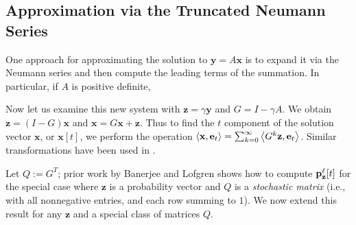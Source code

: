 \subsection{Approximation via the Truncated Neumann Series}

One approach for approximating the solution to $\mathbf{y} = A\mathbf{x}$ is to expand it via the Neumann series and then compute the leading terms of the summation.
In particular, if $A$ is positive definite, 

Now let us examine this new system with $\mathbf{z} = \gamma \mathbf{y}$ and $G = I - \gamma A$. 
We obtain $\mathbf{z} = (I - G)\mathbf{x}$ and $\mathbf{x} = G\mathbf{x} + \mathbf{z}$. 
Thus to find the $t$ component of the solution vector $\mathbf{x}$, or $\mathbf{x}[t]$, we perform the operation $\left< \mathbf{x}, \mathbf{e}_t \right> = \sum_{k=0}^\infty \left< G^k \mathbf{z}, \mathbf{e}_t \right>$. 
Similar transformations have been used in \cite{dimov2015new, lee2014asynchronous, wu2016multi}.

Let $Q:=G^T$; prior work by Banerjee and Lofgren \cite{banerjee2015fast} shows how to compute ${\mathbf{p}}_\mathbf{z}^{\ell}[t]$ for the special case where $\mathbf{z}$ is a probability vector and $Q$ is a \emph{stochastic matrix} (i.e., with all nonnegative entries, and each row summing to $1$). 
We now extend this result for any $\mathbf{z}$ and a special class of matrices $Q$.

